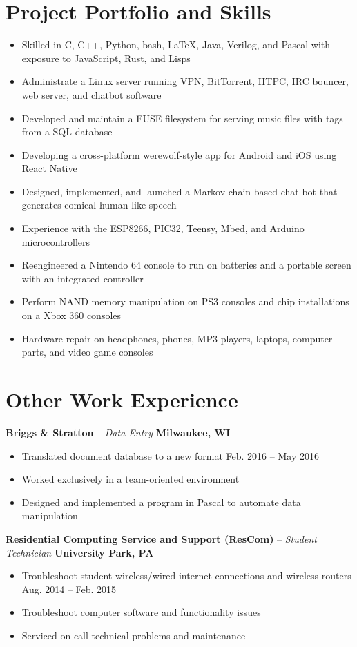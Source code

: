 \documentclass[letterpaper,10pt]{article}
\begin{document}
\section{Project Portfolio and Skills}
\begin{itemize}
\item Skilled in C, C++, Python, bash, LaTeX, Java, Verilog, and Pascal with exposure to JavaScript, Rust, and Lisps
\item Administrate a Linux server running VPN, BitTorrent, HTPC, IRC bouncer, web server, and chatbot software
\item Developed and maintain a FUSE filesystem for serving music files with tags from a SQL database
\item Developing a cross-platform werewolf-style app for Android and iOS using React Native
\item Designed, implemented, and launched a Markov-chain-based chat bot that generates comical human-like speech
\item Experience with the ESP8266, PIC32, Teensy, Mbed, and Arduino microcontrollers
\item Reengineered a Nintendo 64 console to run on batteries and a portable screen with an integrated controller
\item Perform NAND memory manipulation on PS3 consoles and chip installations on a Xbox 360 consoles
\item Hardware repair on headphones, phones, MP3 players, laptops, computer parts, and video game consoles
\end{itemize}

\section{Other Work Experience}
\textbf{Briggs \& Stratton} -- \textit{Data Entry} \hfill \textbf{Milwaukee, WI}
{\setlength{\parskip}{0pt}\begin{itemize}
\item Translated document database to a new format \hfill Feb. 2016 -- May 2016
\item Worked exclusively in a team-oriented environment
\item Designed and implemented a program in Pascal to automate data manipulation
\end{itemize}}
\textbf{Residential Computing Service and Support (ResCom)} -- \textit{Student Technician} \hfill \textbf{University Park, PA}
{\setlength{\parskip}{0pt}\begin{itemize}
\item Troubleshoot student wireless/wired internet connections and wireless routers \hfill Aug. 2014 -- Feb. 2015
\item Troubleshoot computer software and functionality issues
\item Serviced on-call technical problems and maintenance
\end{itemize}}
\end{document}
